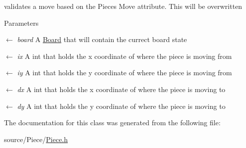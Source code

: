 validates a move based on the Pieces Move attribute. This will be overwritten 
\begin{DoxyParams}{Parameters}
\item[\mbox{$\leftarrow$} {\em board}]A \hyperlink{classBoard}{Board} that will contain the currect board state \item[\mbox{$\leftarrow$} {\em ix}]A int that holds the x coordinate of where the piece is moving from \item[\mbox{$\leftarrow$} {\em iy}]A int that holds the y coordinate of where the piece is moving from \item[\mbox{$\leftarrow$} {\em dx}]A int that holds the x coordinate of where the piece is moving to \item[\mbox{$\leftarrow$} {\em dy}]A int that holds the y coordinate of where the piece is moving to \end{DoxyParams}


The documentation for this class was generated from the following file:\begin{DoxyCompactItemize}
\item 
source/Piece/\hyperlink{Piece_8h}{Piece.h}\end{DoxyCompactItemize}
